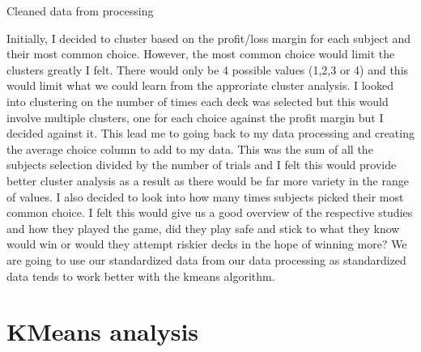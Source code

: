 \documentclass[letterpaper,10pt,english]{jupyterBook}
\begin{document}
\sphinxAtStartPar
Cleaned data from processing

\begin{sphinxVerbatim}[commandchars=\\\{\}]
   
   
   
\end{sphinxVerbatim}

\sphinxAtStartPar
Initially, I decided to cluster based on the profit/loss margin for each subject and their most common choice. However, the most common choice would limit the clusters greatly I felt. There would only be 4 possible values (1,2,3 or 4) and this would limit what we could learn from the approriate cluster analysis. I looked into clustering on the number of times each deck was selected but this would involve multiple clusters, one for each choice against the profit margin but I decided against it. This lead me to going back to my data processing and creating the average choice column to add to my data. This was the sum of all the subjects selection divided by the number of trials and I felt this would provide better cluster analysis as a result as there would be far more variety in the range of values. I also decided to look into how many times subjects picked their most common choice. I felt this would give us a good overview of the respective studies and how they played the game, did they play safe and stick to what they know would win or would they attempt riskier decks in the hope of winning more? We are going to use our standardized data from our data processing as standardized data tends to work better with the k\sphinxhyphen{}means algorithm.


\chapter{K\sphinxhyphen{}Means analysis}
\label{\detokenize{clustering:k-means-analysis}}
\end{document}
